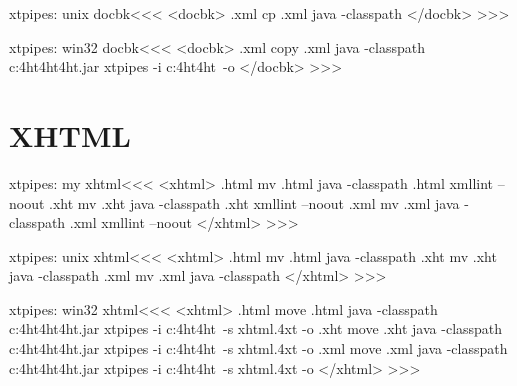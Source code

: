 \documentclass{article}
\begin{document}
\<xtpipes: unix docbk\><<<
<docbk>
.xml cp %
.xml java -classpath %
</docbk>
>>>


\<xtpipes: win32 docbk\><<<
<docbk>
.xml copy %
.xml java -classpath  c:\tex4ht\texmf\tex4ht\bin\tex4ht.jar xtpipes -i c:\tex4ht\texmf\tex4ht\xtpipes\ -o %
</docbk>
>>>








\section{XHTML}

\<xtpipes: my xhtml\><<<
<xhtml>
.html mv %
.html java -classpath %
.html xmllint --noout %
.xht mv %
.xht java -classpath %
.xht xmllint --noout %
.xml mv %
.xml java -classpath %
.xml xmllint --noout %
</xhtml>
>>>


\<xtpipes: unix xhtml\><<<
<xhtml>
.html mv %
.html java -classpath  %
.xht mv %
.xht java -classpath  %
.xml mv %
.xml java -classpath  %
</xhtml>
>>>


\<xtpipes: win32 xhtml\><<<
<xhtml>
.html move %
.html java -classpath  c:\tex4ht\texmf\tex4ht\bin\tex4ht.jar xtpipes -i c:\tex4ht\texmf\tex4ht\xtpipes\ -s xhtml.4xt -o %
.xht move %
.xht java -classpath  c:\tex4ht\texmf\tex4ht\bin\tex4ht.jar xtpipes -i c:\tex4ht\texmf\tex4ht\xtpipes\ -s xhtml.4xt -o %
.xml move %
.xml java -classpath  c:\tex4ht\texmf\tex4ht\bin\tex4ht.jar xtpipes -i c:\tex4ht\texmf\tex4ht\xtpipes\ -s xhtml.4xt -o %
</xhtml>
>>>
\end{document}
